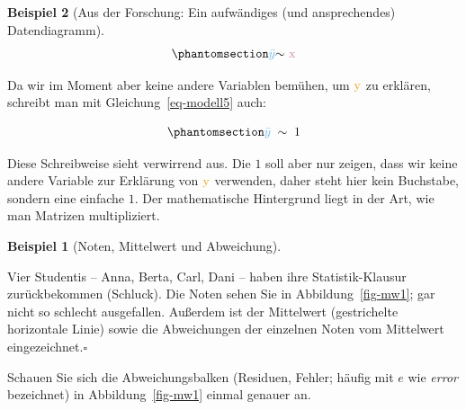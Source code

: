 \documentclass[
  a4paper,
]{scrbook}
\theoremstyle{definition}
\newtheorem{example}{Beispiel}[chapter]
\theoremstyle{definition}
\theoremstyle{definition}
\theoremstyle{remark}
\begin{document}
\begin{example}[Aus der Forschung: Ein aufwändiges (und ansprechendes)
Datendiagramm]
\begin{equation}\phantomsection\label{eq-modell5a}{\color{modelcol}{\bar{y}} \color{black}  { \sim } \color{xcol}{\text{ x}}}\end{equation}

Da wir im Moment aber keine andere Variablen bemühen, um
\(\color{ycol}{\text{y}}\) zu erklären, schreibt man mit
Gleichung~\ref{eq-modell5} auch:

\begin{equation}\phantomsection\label{eq-modell5}{\color{modelcol}{\bar{y}}\;\;  \color{black}{\sim \; 1}}\end{equation}

Diese Schreibweise sieht verwirrend aus. Die \(1\) soll aber nur zeigen,
dass wir keine andere Variable zur Erklärung von
\(\color{ycol}{\text{y}}\) verwenden, daher steht hier kein Buchstabe,
sondern eine einfache \(1\). Der mathematische Hintergrund liegt in der
Art, wie man Matrizen multipliziert.

\begin{example}[Noten, Mittelwert und
Abweichung]\protect\hypertarget{exm-noten}{}\label{exm-noten}

Vier Studentis -- Anna, Berta, Carl, Dani -- haben ihre
Statistik-Klausur zurückbekommen (Schluck). Die Noten sehen Sie in
Abbildung~\ref{fig-mw1}; gar nicht so schlecht ausgefallen. Außerdem ist
der Mittelwert (gestrichelte horizontale Linie) sowie die Abweichungen
der einzelnen Noten vom Mittelwert eingezeichnet.\(\square\)

\end{example}

Schauen Sie sich die Abweichungsbalken (Residuen, Fehler; häufig mit
\(e\) wie \emph{error} bezeichnet) in Abbildung~\ref{fig-mw1} einmal
genauer an.

\begin{figure}

\end{figure}
\end{example}
\end{document}
